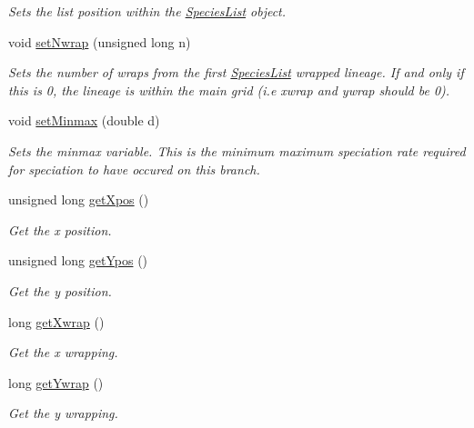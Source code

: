 \begin{DoxyCompactItemize}
\begin{DoxyCompactList}\small\item\em Sets the list position within the \hyperlink{class_species_list}{Species\+List} object. \end{DoxyCompactList}\item 
void \hyperlink{class_data_point_ae73f807fa45356311a58953fb39b4e46}{set\+Nwrap} (unsigned long n)
\begin{DoxyCompactList}\small\item\em Sets the number of wraps from the first \hyperlink{class_species_list}{Species\+List} wrapped lineage. If and only if this is 0, the lineage is within the main grid (i.\+e xwrap and ywrap should be 0). \end{DoxyCompactList}\item 
void \hyperlink{class_data_point_a45a301225a2d39b98d19ed88264b5d31}{set\+Minmax} (double d)
\begin{DoxyCompactList}\small\item\em Sets the minmax variable. This is the minimum maximum speciation rate required for speciation to have occured on this branch. \end{DoxyCompactList}\item 
unsigned long \hyperlink{class_data_point_a4b97b62d0d3438e0317e39084c9b95cb}{get\+Xpos} ()
\begin{DoxyCompactList}\small\item\em Get the x position. \end{DoxyCompactList}\item 
unsigned long \hyperlink{class_data_point_a185dbf2dc87c0cb9aaaa75e7ec65e79a}{get\+Ypos} ()
\begin{DoxyCompactList}\small\item\em Get the y position. \end{DoxyCompactList}\item 
long \hyperlink{class_data_point_a94c95a87b33ce5d986ff74f6a5c96fcd}{get\+Xwrap} ()
\begin{DoxyCompactList}\small\item\em Get the x wrapping. \end{DoxyCompactList}\item 
long \hyperlink{class_data_point_ab9d7976595edc06922c997767afc9424}{get\+Ywrap} ()
\begin{DoxyCompactList}\small\item\em Get the y wrapping. \end{DoxyCompactList}\item 

\end{DoxyCompactItemize}
